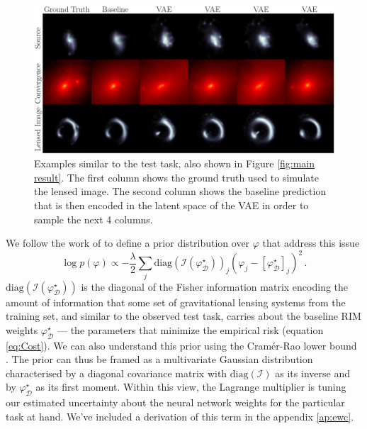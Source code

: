 \begin{figure}[t!]
        \centering
        \includegraphics[width=0.8\linewidth]{figures/vae_samples_similar_to_highlight}
        \caption{Examples similar to the test task, also shown in Figure \ref{fig:main result}. The first column shows the ground truth used to simulate the lensed image. The second column shows the baseline prediction that is then encoded in the latent space of the VAE in order to sample the next 4 columns.
}
        \label{fig:vae fine-tuning}
\end{figure}

We follow the work of \citet{Kirkpatrick2016} to define a prior distribution
over $\varphi$ that address this issue
\begin{equation}\label{eq:Prior} 
        \log p(\varphi) \propto -\frac{\lambda}{2}\sum_{j} \mathrm{diag}(\mathcal{I}(\varphi_{\mathcal{D}}^{\star}))_{j} 
        (\varphi_j - [\varphi^{\star}_{\mathcal{D}}]_{j})^{2}\, .
\end{equation} 
$\mathrm{diag}(\mathcal{I}(\varphi_{\mathcal{D}}^{\star}))$ is the diagonal of the 
Fisher information matrix 
encoding the amount of information that  
some set of gravitational lensing systems from 
the training set, and similar to the observed 
test task, carries about the baseline RIM weights $\varphi_{\mathcal{D}}^{\star}$ 
--- the parameters that minimize the empirical risk (equation \ref{eq:Cost}).
We can also understand this prior using the
Cramér-Rao lower bound 
\citep{Rao1945,Cramer1946}.
The prior can thus be framed as a multivariate 
Gaussian distribution characterised by a diagonal covariance matrix with $\mathrm{diag}(\mathcal{I})$ as its inverse 
and by $\varphi^{\star}_{\mathcal{D}}$ as its first moment.
Within this view, the  
Lagrange multiplier is 
tuning our estimated uncertainty about the neural network weights 
for the particular task at hand.  
We've included a derivation 
of this term in the appendix \ref{ap:ewc}.


